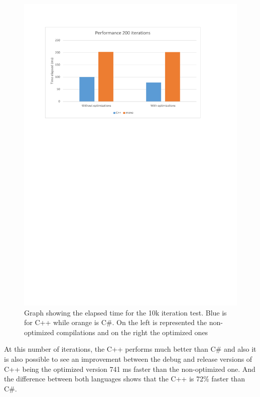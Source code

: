 \begin{figure}[H]\begin{center}
 \centering
  \captionsetup{justification=centering}
  \includegraphics[scale=0.9,page=2]{pictures/performance-tests/GPIO/graphs}
  \caption{Graph showing the elapsed time for the 10k iteration test. Blue is for C++ while orange is C\#. On the left is represented the non-optimized compilations and on the right the optimized ones\label{fig:gpio-graph-10k}}
\end{center}\end{figure}
At this number of iterations, the C++ performs much better than C\# and also it is also possible to see an improvement between the debug and release versions of C++ being the optimized version 741 ms faster than the non-optimized one. And the difference between both languages shows that the C++ is 72\% faster than C\#.

